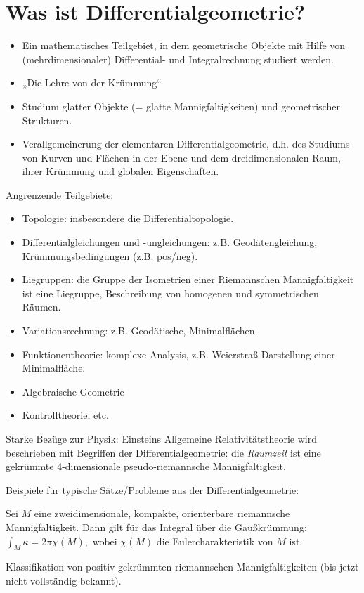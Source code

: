 
\section{Was ist Differentialgeometrie?}

\begin{itemize}
    \item
        Ein mathematisches Teilgebiet, in dem geometrische Objekte mit Hilfe von (mehrdimensionaler) Differential- und Integralrechnung studiert werden.
    \item
        „Die Lehre von der Krümmung“
    \item
        Studium glatter Objekte (= glatte Mannigfaltigkeiten) und geometrischer Strukturen.
    \item
        Verallgemeinerung der elementaren Differentialgeometrie, d.h. des Studiums von Kurven und Flächen in der Ebene und dem dreidimensionalen Raum, ihrer Krümmung und globalen Eigenschaften.
\end{itemize}

Angrenzende Teilgebiete:
\begin{itemize}
    \item
        Topologie: insbesondere die Differentialtopologie.
    \item
        Differentialgleichungen und -ungleichungen: z.B. Geodätengleichung, Krümmungsbedingungen (z.B. pos/neg).
    \item
        Liegruppen: die Gruppe der Isometrien einer Riemannschen Mannigfaltigkeit ist eine Liegruppe, Beschreibung von homogenen und symmetrischen Räumen.
    \item
        Variationsrechnung: z.B. Geodätische, Minimalflächen.
    \item
        Funktionentheorie: komplexe Analysis, z.B. Weierstraß-Darstellung einer Minimalfläche.
    \item
        Algebraische Geometrie
    \item
        Kontrolltheorie, etc.
\end{itemize}

Starke Bezüge zur Physik:
Einsteins Allgemeine Relativitätstheorie wird beschrieben mit Begriffen der Differentialgeometrie: die \emph{Raumzeit} ist eine gekrümmte $4$-dimensionale pseudo-riemannsche Mannigfaltigkeit.

Beispiele für typische Sätze/Probleme aus der Differentialgeometrie:

\begin{st}
    Sei $M$ eine zweidimensionale, kompakte, orienterbare riemannsche Mannigfaltigkeit.
    Dann gilt für das Integral über die Gaußkrümmung:
    \begin{math}
        \int_M \kappa = 2 \pi \chi(M),
    \end{math}
    wobei $\chi(M)$ die Eulercharakteristik von $M$ ist.
\end{st}

\begin{prob}
    Klassifikation von positiv gekrümmten riemannschen Mannigfaltigkeiten (bis jetzt nicht vollständig bekannt).
\end{prob}




